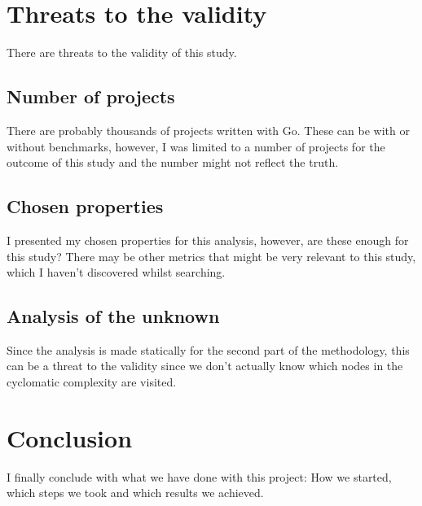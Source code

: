 \documentclass{seal_thesis}
\begin{document}
\chapter{Threats to the validity}
There are threats to the validity of this study.

\section{Number of projects}
There are probably thousands of projects written with Go. These can be with or without benchmarks, however, I was limited to a number of projects for the outcome of this study and the number might not reflect the truth.

\section{Chosen properties}
I presented my chosen properties for this analysis, however, are these enough for this study? There may be other metrics that might be very relevant to this study, which I haven't discovered whilst searching.

\section{Analysis of the unknown}
Since the analysis is made statically for the second part of the methodology, this can be a threat to the validity since we don't actually know which nodes in the cyclomatic complexity are visited.

\chapter{Conclusion}
I finally conclude with what we have done with this project: How we started, which steps we took and which results we achieved.


\backmatter


\end{document}
